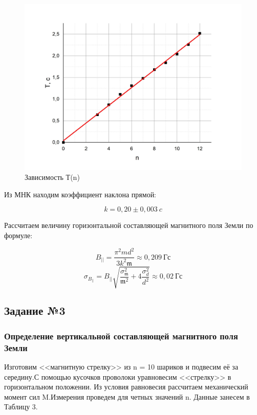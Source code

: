 \documentclass[a4paper,12pt]{article}
\begin{document}
\begin{figure}[h]

\begin{center}

\includegraphics[width = 	15 cm]{graph1}
\caption{Зависимость Т(n)}
\end{center}
\end{figure}

Из МНК находим коэффициент наклона прямой:

$$
	k = 0,20 \pm 0,003 \ c
$$

Рассчитаем величину горизонтальной составляющей магнитного поля Земли по формуле:

$$
	B_{||} = \frac{\pi^2md^2}{3k^2 \mathfrak{m}} \approx 0,209 \ Гс
$$
$$
	\sigma_{B_{||}} = B_{||} \sqrt{\frac{\sigma_{\mathfrak{m}}^2}{\mathfrak{m}^2} + 4 \frac{\sigma_d^2}{d^2}} \approx 0,02 \ Гс
$$

\newpage

\subsection*{Задание №3}

\subsubsection*{Определение вертикальной составляющей магнитного поля Земли}

Изготовим <<магнитную стрелку>> из n = 10 шариков и подвесим её за середину.С помощью кусочков проволоки уравновесим <<стрелку>> в горизонтальном положении. Из условия равновесия рассчитаем механический момент сил M.Измерения проведем для четных значений n. Данные занесем в Таблицу 3.
\end{document}
